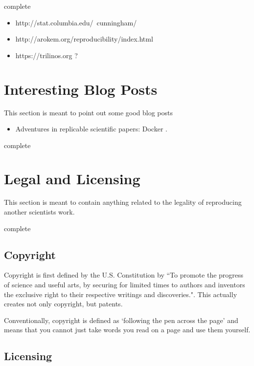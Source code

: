 \documentclass[american]{article}
\newcommand{\complete}{
	\gls{complete}
}
\begin{document}
\complete

\begin{itemize}
\item http://stat.columbia.edu/~cunningham/
\item http://arokem.org/reproducibility/index.html
\item https://trilinos.org ?
\end{itemize}

\section{Interesting Blog Posts} \label{sec:blogposts}

This section is meant to point out some good blog posts

\begin{itemize}
\item Adventures in replicable scientific papers: Docker \cite{titus-brown-docker}.
\end{itemize}

\complete

\section{Legal and Licensing} \label{sec:legal}

This section is meant to contain anything related to the legality of reproducing another scientists work.

\complete

\subsection{Copyright} \label{sec:legal-copyright}

Copyright is first defined by the U.S. Constitution by \cite[art.~I, \S~8, cl.~8]{USConst} ``To promote the progress of science and useful arts, by securing for limited times to authors and inventors the exclusive right to their respective writings and discoveries.". This actually creates not only copyright, but patents.

Conventionally, copyright is defined as `following the pen across the page' and means that you cannot just take words you read on a page and use them yourself.

\subsection{Licensing} \label{sec:legal-licensing}
\end{document}
